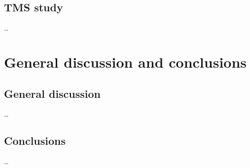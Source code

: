 \documentclass[12pt,]{book}
\begin{document}
\chapter{TMS study}\label{tms-study}

\ldots{}

\part{General discussion and
conclusions}\label{part-general-discussion-and-conclusions}

\chapter{General discussion}\label{general-discussion}

\ldots{}

\chapter{Conclusions}\label{conclusions}

\ldots{}

\noindent
\setlength{\parindent}{-0.20in} \setlength{\leftskip}{0.20in}
\setlength{\parskip}{8pt}


\end{document}
